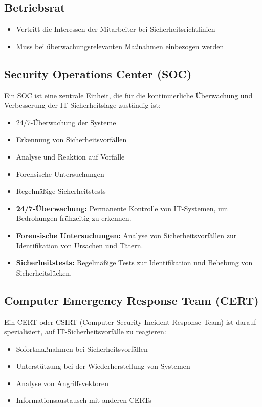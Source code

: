 \documentclass{orgstandard}
\begin{document}
\subsection{Betriebsrat}
\label{sec:orgc121a27}
\begin{itemize}
\item Vertritt die Interessen der Mitarbeiter bei Sicherheitsrichtlinien
\item Muss bei überwachungsrelevanten Maßnahmen einbezogen werden
\end{itemize}
\subsection{Security Operations Center (SOC)}
\label{sec:orgf107de9}
Ein SOC ist eine zentrale Einheit, die für die kontinuierliche Überwachung und Verbesserung der IT-Sicherheitslage zuständig ist:
\begin{itemize}
\item 24/7-Überwachung der Systeme
\item Erkennung von Sicherheitsvorfällen
\item Analyse und Reaktion auf Vorfälle
\item Forensische Untersuchungen
\item Regelmäßige Sicherheitstests
\end{itemize}

\begin{NOTES}
\begin{itemize}
\item \textbf{24/7-Überwachung:} Permanente Kontrolle von IT-Systemen, um Bedrohungen frühzeitig zu erkennen.
\item \textbf{Forensische Untersuchungen:} Analyse von Sicherheitsvorfällen zur Identifikation von Ursachen und Tätern.
\item \textbf{Sicherheitstests:} Regelmäßige Tests zur Identifikation und Behebung von Sicherheitslücken.
\end{itemize}
\end{NOTES}
\subsection{Computer Emergency Response Team (CERT)}
\label{sec:orgf183a6e}
Ein CERT oder CSIRT (Computer Security Incident Response Team) ist darauf spezialisiert, auf IT-Sicherheitsvorfälle zu reagieren:
\begin{itemize}
\item Sofortmaßnahmen bei Sicherheitsvorfällen
\item Unterstützung bei der Wiederherstellung von Systemen
\item Analyse von Angriffsvektoren
\item Informationsaustausch mit anderen CERTs
\end{itemize}
\end{document}
